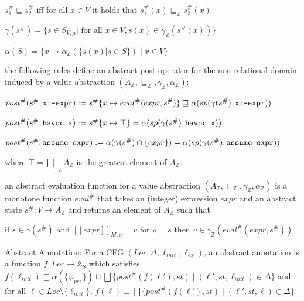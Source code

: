 \documentclass[landscape, a4paper]{article}
\begin{document}
\begin{minipage}[t]{0.2\linewidth}
\begin{betterlist}
\begin{betterlist}
			\item $s^\#_1 \sqsubseteq s^\#_2$ iff for all $x \in V$ it holds that $s^\#_1(x) \sqsubseteq_{\mathbb{Z}} s^\#_2(x)$
			\item $\gamma(s^\#) = \{s \in S_{V ,\mu} | \text{ for all } x \in V, s(x) \in \gamma_{\mathbb{Z}}(s^\#(x))\}$
			\item $\alpha(S) = \{x \mapsto \alpha_{\mathbb{Z}}(\{s(x) | s \in S\}) \mid x \in V\}$
			\item {}
			\item the following rules define an abstract post operator for the non-relational domain induced by a value abstraction $(A_{\mathbb{Z}}, \sqsubseteq_{\mathbb{Z}}, \gamma_{\mathbb{Z}}, \alpha_{\mathbb{Z}})$:
			\begin{betterlist}
				\item $post^\#(s^\#, \verb|x:=expr|) := s^\#\{x \mapsto eval^\#(expr, s^\#)\} \sqsupseteq \alpha(sp(\gamma(s^\#), \verb|x:=expr|))$
				\item $post^\#(s^\#, \verb|havoc x|) := s^\#\{x \mapsto \top\} = \alpha(sp(\gamma(s^\#), \verb|havoc x|))$
				\item $post^\#(s^\#, \verb|assume expr|) := \alpha(\gamma(s^\#) \cap \{expr\}) = \alpha(sp(\gamma(s^\#), \verb|assume expr|))$
			\end{betterlist}
			where $\top= \bigsqcup_{\sqsubseteq_{\mathbb{Z}}} A_{\mathbb{Z}}$ is the greatest element of $A_{\mathbb{Z}}$. 
		\end{betterlist}
		\item an \alert{abstract evaluation function} for a value abstraction $(A_{\mathbb{Z}}, \sqsubset_{\mathbb{Z}}, \gamma_{\mathbb{Z}}, \alpha_{\mathbb{Z}})$ is a monotone function $eval^\#$ that takes an (integer) expression $expr$ and an abstract state $s^\#: V \rightarrow A_{\mathbb{Z}}$ and returns an element of $A_{\mathbb{Z}}$ such that
		\begin{betterlist}
			\item if $s \in \gamma(s^\#)$ and $[[expr]]_{M,\rho} = v$ for $\rho = s$ then $v \in \gamma_{\mathbb{Z}}(eval^\#(expr, s^\#))$
		\end{betterlist}
  \item \color{orange}\alert{Abstract Annotation}: For a CFG $(Loc, \Delta, \ell_{init}, \ell_{ex})$, an \alert{abstract annotation} is a function $f: Loc \rightarrow \mathbb{A}_S$ which satisfies $f(\ell_{init}) \sqsupseteq \alpha(\{\varphi_{pre}\}) \sqcup \bigsqcup \{post^\#(f(\ell'), st) \mid (\ell′, st, \ell_{init}) \in \Delta\}$ and for all $\ell \in Loc \setminus \{\ell_{init}\}$, $f(\ell) \sqsupseteq \bigsqcup \{post^\#(f(\ell'), st) \mid (\ell', st, \ell) \in \Delta\}$\color{black}

\end{betterlist}
\end{minipage}
\end{document}
